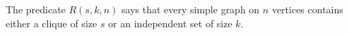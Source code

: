 \begin{definition}
The predicate \(R(s,k,n)\) says that every simple graph on \(n\) vertices contains either a clique of size \(s\) or an independent set of size \(k\).
\end{definition}
